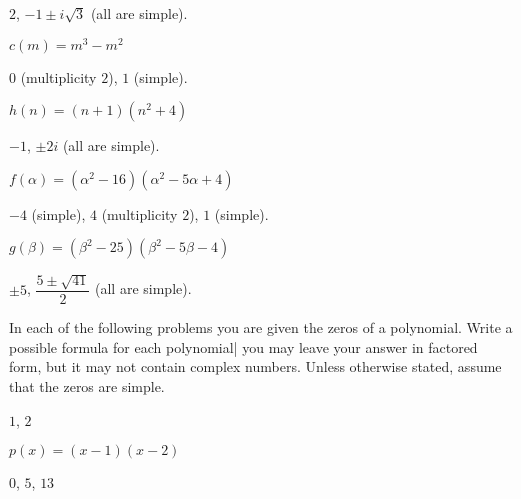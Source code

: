 \begin{exercises}
\begin{problem}[Zeros]
\begin{multicols}{3}
\begin{subproblem}
 		\begin{shortsolution}
 			$2$, $-1\pm i\sqrt{3}$ (all are simple).
 		\end{shortsolution}
 	\end{subproblem}
 	\begin{subproblem}
 		$c(m)=m^3-m^2$
 		\begin{shortsolution}
 			$0$ (multiplicity $2$), $1$ (simple).
 		\end{shortsolution}
 	\end{subproblem}
 	\begin{subproblem}
 		$h(n)=(n+1)(n^2+4)$ 
 		\begin{shortsolution}
 			$-1$, $\pm 2i$ (all are simple).
 		\end{shortsolution}
 	\end{subproblem}
 	\begin{subproblem}
 		$f(\alpha)=(\alpha^2-16)(\alpha^2-5\alpha+4)$ 
 		\begin{shortsolution}
 			$-4$ (simple), $4$ (multiplicity $2$), $1$ (simple).
 		\end{shortsolution}
 	\end{subproblem}
 	\begin{subproblem}
 		$g(\beta)=(\beta^2-25)(\beta^2-5\beta-4)$ 
 		\begin{shortsolution}
 			$\pm 5$, $\dfrac{5\pm\sqrt{41}}{2}$ (all are simple).
 		\end{shortsolution}
 	\end{subproblem}
 \end{multicols}
 \end{problem}
 \begin{problem}
 In each of the following problems you are given the zeros of a polynomial. 
 Write a possible formula for each polynomial| you may leave your 
 answer in factored form, but it may not contain complex numbers. Unless
 otherwise stated, assume that the zeros are simple.
 \begin{multicols}{3}
 	\begin{subproblem}
 		$1$, $2$ 
 		\begin{shortsolution}
 			$p(x)=(x-1)(x-2)$
 		\end{shortsolution}
 	\end{subproblem}
 	\begin{subproblem}
 		$0$, $5$, $13$ 
 		\begin{shortsolution}

\end{shortsolution}
\end{subproblem}
\end{multicols}
\end{problem}
\end{exercises}
